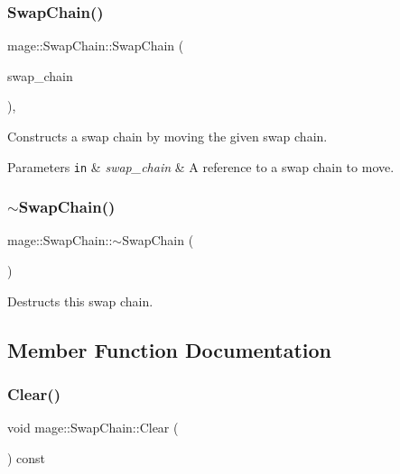 \subsubsection{\texorpdfstring{Swap\+Chain()}{SwapChain()}\hspace{0.1cm}{\footnotesize\ttfamily [3/3]}}
{\footnotesize\ttfamily mage\+::\+Swap\+Chain\+::\+Swap\+Chain (\begin{DoxyParamCaption}\item[{\hyperlink{classmage_1_1_swap_chain}{Swap\+Chain} \&\&}]{swap\+\_\+chain }\end{DoxyParamCaption})\hspace{0.3cm}{\ttfamily [default]}, {\ttfamily [noexcept]}}

Constructs a swap chain by moving the given swap chain.


\begin{DoxyParams}[1]{Parameters}
\mbox{\tt in}  & {\em swap\+\_\+chain} & A reference to a swap chain to move. \\
\hline
\end{DoxyParams}
\hypertarget{classmage_1_1_swap_chain_a853168cba69cadc3d8c10ad2f4939e72}{}\label{classmage_1_1_swap_chain_a853168cba69cadc3d8c10ad2f4939e72} 
\subsubsection{\texorpdfstring{$\sim$\+Swap\+Chain()}{~SwapChain()}}
{\footnotesize\ttfamily mage\+::\+Swap\+Chain\+::$\sim$\+Swap\+Chain (\begin{DoxyParamCaption}{ }\end{DoxyParamCaption})}

Destructs this swap chain. 

\subsection{Member Function Documentation}
\hypertarget{classmage_1_1_swap_chain_a94b28938ba9e402665197a71409ae43a}{}\label{classmage_1_1_swap_chain_a94b28938ba9e402665197a71409ae43a} 
\subsubsection{\texorpdfstring{Clear()}{Clear()}}
{\footnotesize\ttfamily void mage\+::\+Swap\+Chain\+::\+Clear (\begin{DoxyParamCaption}{ }\end{DoxyParamCaption}) const\hspace{0.3cm}{\ttfamily [noexcept]}}

